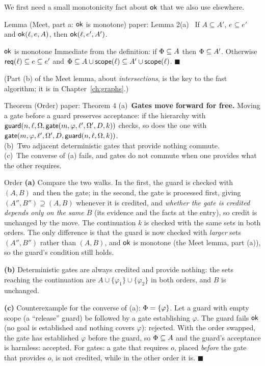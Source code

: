 We first need a small monotonicity fact about $\mathsf{ok}$ that we also use elsewhere.

\begin{statement}{Lemma (Meet, part a: $\mathsf{ok}$ is monotone) \hfill\normalfont paper: Lemma 2(a)}
\
If $A\subseteq A'$, $e\subseteq e'$ and $\mathsf{ok}(\ell,e,A)$, then $\mathsf{ok}(\ell,e',A')$.
\end{statement}

\begin{plainproof}{$\mathsf{ok}$ is monotone}
Immediate from the definition: if $\Phi\subseteq A$ then $\Phi\subseteq A'$. Otherwise $\mathsf{req}(\ell)\subseteq e\subseteq e'$ and $\Phi\subseteq A\cup\mathsf{scope}(\ell)\subseteq A'\cup\mathsf{scope}(\ell)$. \hfill$\blacksquare$
\end{plainproof}

(Part (b) of the Meet lemma, about \emph{intersections}, is the key to the fast algorithm; it is in Chapter~\ref{ch:graphs}.)

\begin{statement}{Theorem (Order) \hfill\normalfont paper: Theorem 4}
(a)~\textbf{Gates move forward for free.} Moving a gate before a guard preserves acceptance: if the hierarchy with $\mathsf{guard}(n,\ell,\Omega,\mathsf{gate}(m,\varphi,\ell',\Omega',D,k))$ checks, so does the one with $\mathsf{gate}(m,\varphi,\ell',\Omega',D,\mathsf{guard}(n,\ell,\Omega,k))$.\\
(b)~Two adjacent deterministic gates that provide nothing commute.\\
(c)~The converse of (a) fails, and gates do not commute when one provides what the other requires.
\end{statement}

\begin{plainproof}{Order}
\textbf{(a)} Compare the two walks. In the first, the guard is checked with $(A,B)$ and then the gate; in the second, the gate is processed first, giving $(A'',B'')\supseteq(A,B)$ whenever it is credited, and \emph{whether the gate is credited depends only on the same $B$} (its evidence and the facts at the entry), so credit is unchanged by the move. The continuation $k$ is checked with the same sets in both orders. The only difference is that the guard is now checked with \emph{larger} sets $(A'',B'')$ rather than $(A,B)$, and $\mathsf{ok}$ is monotone (the Meet lemma, part (a)), so the guard's condition still holds.

\textbf{(b)} Deterministic gates are always credited and provide nothing: the sets reaching the continuation are $A\cup\{\varphi_1\}\cup\{\varphi_2\}$ in both orders, and $B$ is unchanged.

\textbf{(c)} Counterexample for the converse of (a): $\Phi=\{\varphi\}$. Let a guard with empty scope (a ``release'' guard) be followed by a gate establishing $\varphi$. The guard fails $\mathsf{ok}$ (no goal is established and nothing covers $\varphi$): rejected. With the order swapped, the gate has established $\varphi$ before the guard, so $\Phi\subseteq A$ and the guard's acceptance is harmless: accepted. For gates: a gate that requires $o$, placed \emph{before} the gate that provides $o$, is not credited, while in the other order it is. \hfill$\blacksquare$
\end{plainproof}

